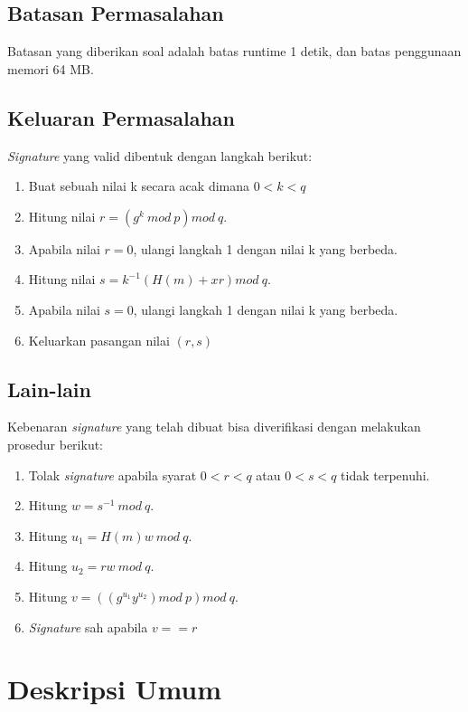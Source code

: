 \subsection {Batasan Permasalahan}

Batasan yang diberikan soal adalah batas runtime 1 detik, dan batas penggunaan memori 64 MB.

\subsection {Keluaran Permasalahan}

\textit{Signature} yang valid dibentuk dengan langkah berikut:
\begin{enumerate}
\item Buat sebuah nilai k secara acak dimana $0 < k < q$
\item Hitung nilai $r = \left(g^k\ mod\ p\right) mod\ q$.
\item Apabila nilai $r = 0$, ulangi langkah 1 dengan nilai k yang berbeda.
\item Hitung nilai $s = k^{-1}\left(H(m) + xr\right) mod\ q$.
\item Apabila nilai $s = 0$, ulangi langkah 1 dengan nilai k yang berbeda.
\item Keluarkan pasangan nilai $(r, s)$
\end{enumerate}

\subsection {Lain-lain}
Kebenaran \textit{signature} yang telah dibuat bisa diverifikasi dengan melakukan prosedur berikut:

\begin{enumerate}
\item Tolak \textit{signature} apabila syarat $0 < r < q$ atau $0 < s < q$ tidak terpenuhi.
\item Hitung $w = s^{-1}\ mod\ q$.
\item Hitung $u_1 = H(m) w\ mod\ q$.
\item Hitung $u_2 = r w\ mod\ q$.
\item Hitung $v = \left(\left(g^{u_1} y^{u_2}\right) mod\ p\right) mod\ q$.
\item \textit{Signature} sah apabila $v == r$
\end{enumerate}

\section{Deskripsi Umum}

